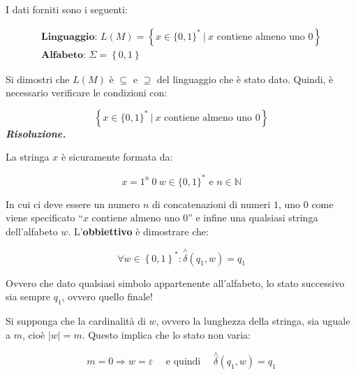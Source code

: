 \documentclass[a4paper]{article}
\newcommand{\dquotes}[1]{``#1''}
\begin{document}
	\noindent
	I dati forniti sono i seguenti:
	
	\begin{gather*}
		\textbf{Linguaggio: } L(M) = \left\{x \in \{0, 1\}^* \: | \: x \text{ contiene almeno uno } 0 \right\} \\
		\textbf{Alfabeto: } \Sigma = \left\{0, 1\right\}
	\end{gather*}
	
	\noindent
	Si dimostri che $L(M)$ è $\subseteq$ e $\supseteq$ del linguaggio che è stato dato. Quindi, è necessario verificare le condizioni con:
	
	\begin{equation*}
		\left\{x \in \{0, 1\}^* \: | \: x \text{ contiene almeno uno } 0 \right\}
	\end{equation*}
	\newline
	\noindent
	\textcolor{Green4}{\textbf{\emph{Risoluzione.}}}
	
	\noindent
	La stringa $x$ è sicuramente formata da:
	
	\begin{equation*}
		x = 1^{n}\: 0 \: w \in \{0,1\}^{*} \text{ e } n \in \mathbb{N}
	\end{equation*}
	
	\noindent
	In cui ci deve essere un numero $n$ di concatenazioni di numeri $1$, uno $0$ come viene specificato \dquotes{$x \text{ contiene almeno uno } 0$} e infine una qualsiasi stringa dell'alfabeto $w$. L'\textbf{obbiettivo} è dimostrare che:
	
	\begin{equation*}
		\forall w \in \left\{0, 1\right\}^{*} : \overset{\wedge}{\delta} (q_{1}, w) = q_{1}
	\end{equation*}

	\noindent
	Ovvero che dato qualsiasi simbolo appartenente all'alfabeto, lo stato successivo sia sempre $q_{1}$, ovvero quello finale!
	
	\newpage
	
	Si supponga che la cardinalità di $w$, ovvero la lunghezza della stringa, sia uguale a $m$, cioè $|w| = m$. Questo implica che lo stato non varia:
	
	\begin{equation*}
		m = 0 \Longrightarrow w = \varepsilon \hspace{1em} \text{ e quindi } \hspace{1em} \overset{\wedge}{\delta} (q_{1}, w) = q_{1}
	\end{equation*}
\end{document}

